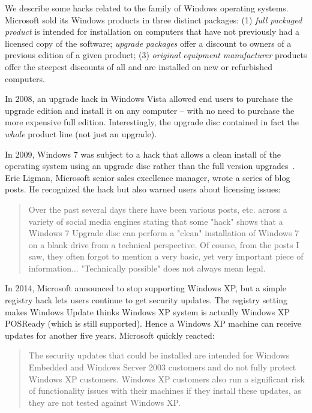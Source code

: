 \dcs
%
 We describe some hacks related to the family of Windows operating systems. Microsoft sold its Windows products in three distinct packages: (1) \emph{full packaged product} is intended for installation on computers that have not previously had a licensed copy of the software; \emph{upgrade packages} offer a discount to owners of a previous edition of a given product; 
 (3) \emph{original equipment manufacturer} products offer the steepest discounts of all and are installed on new or refurbished computers.

In 2008, an upgrade hack in Windows Vista allowed end users to purchase the upgrade edition and install it on any computer -- with no need to purchase the more expensive full edition. Interestingly, the upgrade disc contained in fact the \emph{whole} product line (\ie not just an upgrade).
%

In 2009, Windows 7 was subject to a hack that allows a clean install of the operating system using an upgrade disc rather than the full version upgrades~\cite{w7microsoft}. 
Eric Ligman, Microsoft senior sales excellence manager, wrote a series of blog posts. 
He recognized the hack but also warned users about licensing issues:
\begin{quote}
Over the past several days there have been various posts, etc. across a variety of social media engines stating that some "hack" shows that a Windows 7 Upgrade disc can perform a "clean" installation of Windows 7 on a blank drive from a technical perspective. 
Of course, from the posts I saw, they often forgot to mention a very basic, yet very important piece of information... "Technically possible" does not always mean legal. 
\end{quote} 

In 2014, Microsoft announced to stop supporting Windows XP, but a simple registry hack lets users continue to get security updates.
The registry setting makes Windows Update thinks Windows XP system is actually Windows XP POSReady (which is still supported). 
Hence a Windows XP machine can receive updates for another five years. %
Microsoft quickly reacted: 
\begin{quote}
The security updates that could be installed are intended for Windows Embedded and Windows Server 2003 customers and do not fully protect Windows XP customers. Windows XP customers also run a significant risk of functionality issues with their machines if they install these updates, as they are not tested against Windows XP.
\end{quote}


